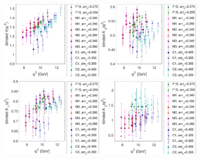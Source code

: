 \documentclass[a4paper,10pt]{article}
\begin{document}
\begin{figure}[p]
 \includegraphics[width=0.45\textwidth]{figures/BsDsStarV_Ratio_combined.pdf} 
\includegraphics[width=0.45\textwidth]{figures/BsDsStarA0_Ratio_combined.pdf}\\ 
\includegraphics[width=0.45\textwidth]{figures/BsDsStarA1_Ratio_combined.pdf} 
\includegraphics[width=0.45\textwidth]{figures/BsDsStarA2_Ratio_combined.pdf} 
\end{figure}
\clearpage
\end{document}
